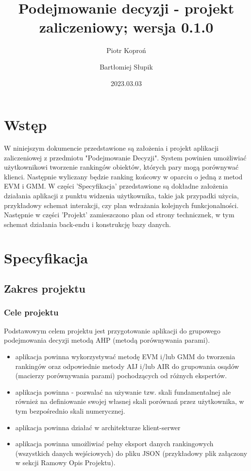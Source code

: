 \documentclass{article}
\author{Piotr Koproń \and Bartłomiej Słupik}
\date{2023.03.03}
\title{Podejmowanie decyzji - projekt zaliczeniowy; wersja 0.1.0}
\begin{document}
\maketitle
\tableofcontents
\newpage

\section{Wstęp}
W niniejszym dokumencie przedstawione są założenia i projekt aplikacji zaliczeniowej z przedmiotu "Podejmowanie Decyzji".
System powinien umożliwiać użytkownikowi tworzenie rankingów obiektów, których pary mogą porównywać klienci.
Następnie wyliczany będzie ranking końcowy w oparciu o jedną z metod EVM i GMM.
W części 'Specyfikacja' przedstawione są dokładne założenia działania aplikacji z punktu widzenia użytkownika, takie jak
przypadki użycia, przykładowy schemat interakcji, czy plan wdrażania kolejnych funkcjonalności.
Następnie w części 'Projekt' zamieszczono plan od strony technicznek, w tym schemat działania back-endu i konstrukcję bazy danych.

\section{Specyfikacja}
\subsection{Zakres projektu}
\subsubsection{Cele projektu}
Podstawowym celem projektu jest przygotowanie aplikacji do grupowego podejmowania decyzji metodą AHP (metodą porównywania parami). \\
\begin{itemize}
    \item aplikacja powinna wykorzystywać metodę EVM i/lub GMM do tworzenia rankingów oraz odpowiednie metody 
    AIJ i/lub AIR do grupowania osądów (macierzy porównywania parami) pochodzących od różnych ekspertów. 
    \item aplikacja powinna - pozwalać na używanie tzw. skali fundamentalnej ale również na definiowanie
    swojej własnej skali porównań przez użytkownika, w tym bezpośrednio skali numerycznej. 
    \item aplikacja powinna działać w architekturze klient-serwer 
    \item aplikacja powinna umożliwiać pełny eksport danych rankingowych (wszystkich danych wejściowych) 
    do pliku JSON (przykładowy plik załączony w sekcji Ramowy Opis Projektu).
\end{itemize}
\end{document}
